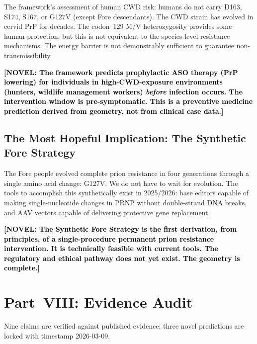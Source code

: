 \documentclass[12pt,a4paper]{article}
\newcommand{\novel}[1]{\textbf{\textcolor{black}{[NOVEL: #1]}}}
\begin{document}
The framework's assessment of human CWD risk: humans do not carry D163,
S174, S167, or G127V (except Fore descendants). The CWD strain has evolved
in cervid PrP for decades. The codon~129 M/V heterozygosity provides some
human protection, but this is not equivalent to the species-level resistance
mechanisms. The energy barrier is not demonstrably sufficient to guarantee
non-transmissibility.

\novel{The framework predicts prophylactic ASO therapy (PrP lowering) for
individuals in high-CWD-exposure environments (hunters, wildlife management
workers) \textit{before} infection occurs. The intervention window is
pre-symptomatic. This is a preventive medicine prediction derived from
geometry, not from clinical case data.}

\subsection{The Most Hopeful Implication: The Synthetic Fore Strategy}

The Fore people evolved complete prion resistance in four generations through
a single amino acid change: G127V. We do not have to wait for evolution.
The tools to accomplish this synthetically exist in 2025/2026: base editors
capable of making single-nucleotide changes in PRNP without double-strand
DNA breaks, and AAV vectors capable of delivering protective gene replacement.

\novel{The Synthetic Fore Strategy is the first derivation, from principles,
of a single-procedure permanent prion resistance intervention. It is
technically feasible with current tools. The regulatory and ethical pathway
does not yet exist. The geometry is complete.}

\section{Part~VIII: Evidence Audit}

Nine claims are verified against published evidence; three novel predictions
are locked with timestamp 2026-03-09.
\end{document}
